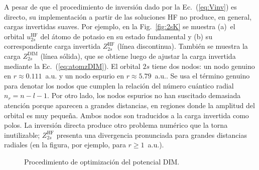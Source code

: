 A pesar de que el procedimiento de inversión dado por la 
Ec.~(\ref{eq:Vinv}) es directo, su implementación a partir de las 
soluciones HF no produce, en general, cargas invertidas suaves. Por 
ejemplo, en la Fig.~\ref{fig:2sK} se muestra (a)~el orbital 
$u_{2s}^{\mathrm{HF}}$ del átomo de potasio en su estado fundamental y 
(b) su correspondiente carga invertida $Z_{2s}^{\mathrm{HF}}$ (línea 
discontinua). También se muestra la carga $Z_{2s}^{\mathrm{DIM}}$ (línea 
sólida), que se obtiene luego de ajustar la carga invertida mediante la 
Ec.~(\ref{eq:atomzDIM}). El orbital $2s$ tiene dos nodos: un nodo 
genuino en $r\approx 0.111$~a.u. y un nodo espurio en 
\mbox{$r\approx 5.79$~a.u.}. Se usa el término genuino para denotar los 
nodos que cumplen la relación del número cuántico radial $n_r=n-l-1$. 
Por otro lado, los nodos espurios no han suscitado demasiada atención 
porque aparecen a grandes distancias, en regiones donde la amplitud del 
orbital es muy pequeña. Ambos nodos son traducidos a la carga invertida 
como polos. La inversión directa produce otro problema numérico que la 
torna inutilizable; $Z_{2s}^{\mathrm{HF}}$ presenta una 
divergencia pronunciada para grandes distancias radiales (en la figura, 
por ejemplo, para $r\geq 1$~a.u.). 

\begin{figure}[t]
\centering
{}
\caption{Procedimiento de optimización del potencial DIM.}
\label{fig:procDIM}
\end{figure}

